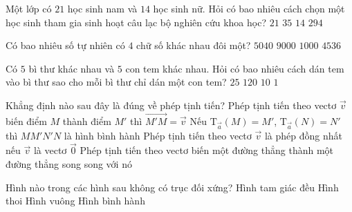 \begin{ex}%
	 Một lớp có $21$ học sinh nam và $14$ học sinh nữ. Hỏi có bao nhiêu cách chọn một học sinh tham gia sinh hoạt câu lạc bộ nghiên cứu khoa học?
	\choice
	{$21$}
	{\True $35$}
	{$14$}
	{$294$}
\end{ex}
\begin{ex}%
 Có bao nhiêu số tự nhiên có $4$ chữ số khác nhau đôi một?
	\choice
	{$5040$}
	{$9000$}
	{$1000$}
	{\True $4536$}
\end{ex}
\begin{ex}%
	 Có $5$ bì thư khác nhau và $5$ con tem khác nhau. Hỏi có bao nhiêu cách dán tem vào bì thư sao cho mỗi bì thư chỉ dán một con tem?
	\choice
	{$25$}
	{\True $120$}
	{$10$}
	{$1$}
\end{ex}
\begin{ex}%
 Khẳng định nào sau đây là đúng về phép tịnh tiến?
	\choice
{Phép tịnh tiến theo vectơ $\overrightarrow{v}$ biến điểm $M$ thành điểm $M'$ thì $\overrightarrow{{M'M}}=\overrightarrow{v} $}
{Nếu $\mathrm{T}_{\overrightarrow{a}}\left(M\right)
	={M'}$, $\mathrm{T}_{\overrightarrow{a}}\left(N\right)
	=N'$ thì $MM'N'N$ là hình bình hành}
{\True Phép tịnh tiến theo vectơ $\overrightarrow{v}$ là phép đồng nhất nếu $\overrightarrow{v}$ là vectơ $\overrightarrow{0}$}
{Phép tịnh tiến theo vectơ biến một đường thẳng thành một đường thẳng song song với nó}
\end{ex}
\begin{ex}%
Hình nào trong các hình sau không có trục đối xứng?
	\choice
	{Hình tam giác đều}
	{Hình thoi}
	{Hình vuông}
	{\True Hình bình hành}
\end{ex}

